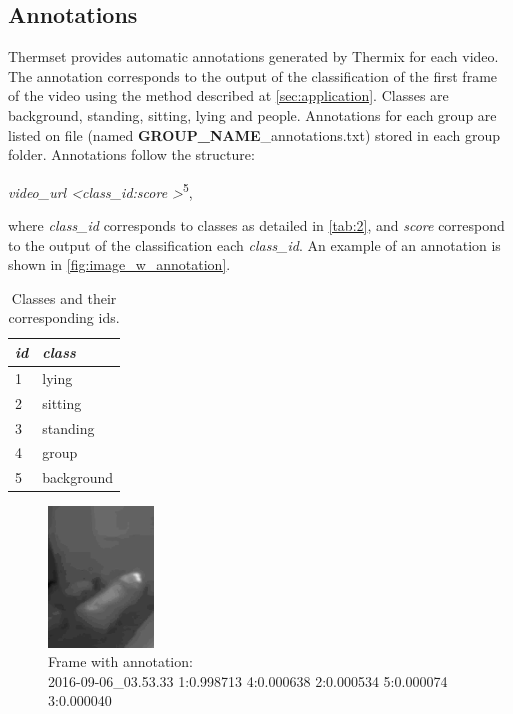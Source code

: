 \documentclass[oneside, twocolumn]{article}
\begin{document}
\subsection{Annotations}
\label{subsec:annotations}
Thermset provides automatic annotations generated by Thermix for each video. The annotation corresponds to the output of the classification of the first frame of the video using the method described at \autoref{sec:application}. Classes are background, standing, sitting, lying and people. Annotations for each group are listed on file (named \textbf{GROUP\_NAME}\_annotations.txt) stored in each group folder. Annotations follow the structure:

	\textit{video\_url \textbraceleft \textless class\_id:score \textgreater}\textbraceright \textsuperscript{5},

	where \textit{class\_id} corresponds to classes as detailed in \autoref{tab:2}, and \textit{score} correspond to the output of the classification each \textit{class\_id}.
  An example of an annotation is shown in \autoref{fig:image_w_annotation}.
\begin{table}
\center
	\begin{tabular}{l | l}
\textit{id} & \textit{class} \\
\hline
1 & lying \\
2 & sitting \\
3 & standing \\
4 & group \\
5 & background \\
\end{tabular}
  \caption{Classes and their corresponding ids.}
  \label{tab:2}
\end{table}

\begin{figure}
  \centering
    \includegraphics[width=0.25\textwidth]{images/image_with_annotation.png}
  \caption{Frame with annotation: \\2016-09-06\_03.53.33 1:0.998713 4:0.000638 2:0.000534 5:0.000074 3:0.000040}
  \label{fig:image_w_annotation}
\end{figure}
\end{document}

